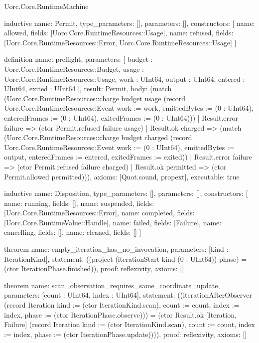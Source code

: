 \begin{lexlean}{Uorc.Core.RuntimeMachine}
\begin{semanticmodule}
inductive{
  name: Permit,
  type_parameters: [],
  parameters: [],
  constructors: [
    {name: allowed, fields: [Uorc.Core.RuntimeResources::Usage]},
    {name: refused, fields: [Uorc.Core.RuntimeResources::Error, Uorc.Core.RuntimeResources::Usage]}
  ]
}

definition{
  name: preflight,
  parameters: [
    budget : Uorc.Core.RuntimeResources::Budget,
    usage : Uorc.Core.RuntimeResources::Usage,
    work : UInt64,
    output : UInt64,
    entered : UInt64,
    exited : UInt64
  ],
  result: Permit,
  body: (match (Uorc.Core.RuntimeResources::charge budget usage (record Uorc.Core.RuntimeResources::Event {work := work, emittedBytes := (0 : UInt64), enteredFrames := (0 : UInt64), exitedFrames := (0 : UInt64)}))
    | Result.error failure => (ctor Permit.refused failure usage)
    | Result.ok charged => (match (Uorc.Core.RuntimeResources::charge budget charged (record Uorc.Core.RuntimeResources::Event {work := (0 : UInt64), emittedBytes := output, enteredFrames := entered, exitedFrames := exited}))
      | Result.error failure => (ctor Permit.refused failure charged)
      | Result.ok permitted => (ctor Permit.allowed permitted))),
  axioms: [Quot.sound, propext],
  executable: true
}

inductive{
  name: Disposition,
  type_parameters: [],
  parameters: [],
  constructors: [
    {name: running, fields: []},
    {name: suspended, fields: [Uorc.Core.RuntimeResources::Error]},
    {name: completed, fields: [Uorc.Core.RuntimeValue::Handle]},
    {name: failed, fields: [Failure]},
    {name: cancelling, fields: []},
    {name: cleaned, fields: []}
  ]
}

theorem{
  name: empty_iteration_has_no_invocation,
  parameters: [kind : IterationKind],
  statement: ((project (iterationStart kind (0 : UInt64)) phase) = (ctor IterationPhase.finished)),
  proof: reflexivity{},
  axioms: []
}

theorem{
  name: scan_observation_requires_same_coordinate_update,
  parameters: [count : UInt64, index : UInt64],
  statement: ((iterationAfterObserver (record Iteration {kind := (ctor IterationKind.scan), count := count, index := index, phase := (ctor IterationPhase.observe)})) = (ctor Result.ok [Iteration, Failure] (record Iteration {kind := (ctor IterationKind.scan), count := count, index := index, phase := (ctor IterationPhase.update)}))),
  proof: reflexivity{},
  axioms: []
}
\end{semanticmodule}
\end{lexlean}
